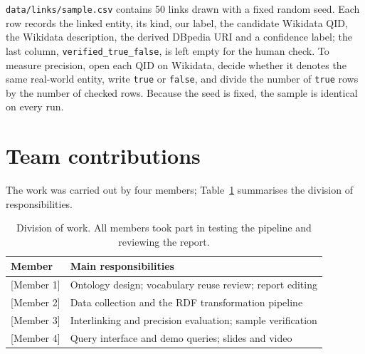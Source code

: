 \texttt{data/links/sample.csv} contains 50 links drawn with a fixed random
seed. Each row records the linked entity, its kind, our label, the candidate
Wikidata QID, the Wikidata description, the derived DBpedia URI and a
confidence label; the last column, \texttt{verified\_true\_false}, is left
empty for the human check. To measure precision, open each QID on Wikidata,
decide whether it denotes the same real-world entity, write \texttt{true} or
\texttt{false}, and divide the number of \texttt{true} rows by the number of
checked rows. Because the seed is fixed, the sample is identical on every run.

\section{Team contributions}

The work was carried out by four members; Table~\ref{tab:contributions}
summarises the division of responsibilities.

\begin{table}[h]
  \centering
  \begin{tabular}{@{}ll@{}}
    \toprule
    Member & Main responsibilities \\
    \midrule
    {[Member 1]} & Ontology design; vocabulary reuse review; report editing \\
    {[Member 2]} & Data collection and the RDF transformation pipeline \\
    {[Member 3]} & Interlinking and precision evaluation; sample verification \\
    {[Member 4]} & Query interface and demo queries; slides and video \\
    \bottomrule
  \end{tabular}
  \caption{Division of work. All members took part in testing the pipeline and
  reviewing the report.}
  \label{tab:contributions}
\end{table}
